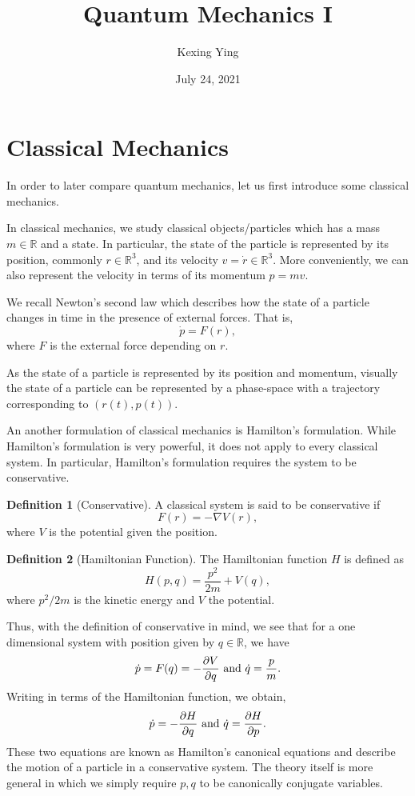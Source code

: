\documentclass[]{article}
\title{Quantum Mechanics I}
\author{Kexing Ying}
\date{July 24, 2021}
\theoremstyle{definition}
\theoremstyle{definition}
\newtheorem{definition}{Definition}[section]
\begin{document}
\maketitle

{
\hypersetup{linkcolor=}
\setcounter{tocdepth}{2}
\tableofcontents
}
\newpage

\section{Classical Mechanics}

In order to later compare quantum mechanics, let us first introduce some 
classical mechanics. 

In classical mechanics, we study classical objects/particles 
which has a mass \(m \in \mathbb{R}\) and a state. In particular, the state 
of the particle is represented by its position, commonly \(r \in \mathbb{R}^3\), 
and its velocity \(v = \dot r \in \mathbb{R}^3\). More conveniently, we can also 
represent the velocity in terms of its momentum \(p = mv\).

We recall Newton's second law which describes how the state of a particle changes 
in time in the presence of external forces. That is, 
\[\dot p = F(r),\]
where \(F\) is the external force depending on \(r\).

As the state of a particle is represented by its position and momentum, visually 
the state of a particle can be represented by a phase-space with a trajectory 
corresponding to \((r(t), p(t))\). 

An another formulation of classical mechanics is Hamilton's formulation. While 
Hamilton's formulation is very powerful, it does not apply to every classical system. 
In particular, Hamilton's formulation requires the system to be conservative. 

\begin{definition}[Conservative]
  A classical system is said to be conservative if 
  \[F(r) = - \nabla V(r),\]
  where \(V\) is the potential given the position.
\end{definition}

\begin{definition}[Hamiltonian Function]
  The Hamiltonian function \(H\) is defined as 
  \[H(p, q) = \frac{p^2}{2m} + V(q),\]
  where \(p^2/2m\) is the kinetic energy and \(V\) the potential.
\end{definition}

Thus, with the definition of conservative in mind, we see that for a one 
dimensional system with position given by \(q \in \mathbb{R}\), we have
\[\dot p = F(q) = - \pdv{V}{q} \text{ and } \dot q = \frac{p}{m}.\]
Writing in terms of the Hamiltonian function, we obtain, 
\[\dot p = - \pdv{H}{q} \text{ and } \dot q = \pdv{H}{p}.\]
These two equations are known as Hamilton's canonical equations and describe 
the motion of a particle in a conservative system. The theory itself is more 
general in which we simply require \(p, q\) to be canonically conjugate 
variables.
\end{document}
